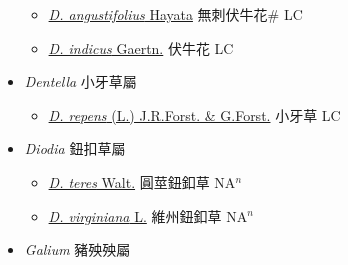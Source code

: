 \begin{itemize}
  \begin{itemize}
        \item[] \href{http://www.theplantlist.org/tpl1.1/search?q=Damnacanthus+angustifolius}{\textit{D. angustifolius} Hayata}   無刺伏牛花\# LC
        \item[] \href{http://www.theplantlist.org/tpl1.1/search?q=Damnacanthus+indicus}{\textit{D. indicus} Gaertn.}   伏牛花 LC
  \end{itemize}
 \item[] \textit{Dentella} 小牙草屬
                    
  \begin{itemize}
        \item[] \href{http://www.theplantlist.org/tpl1.1/search?q=Dentella+repens}{\textit{D. repens} (L.) J.R.Forst. \& G.Forst.}   小牙草 LC
  \end{itemize}
 \item[] \textit{Diodia} 鈕扣草屬
                    
  \begin{itemize}
        \item[] \href{http://www.theplantlist.org/tpl1.1/search?q=Diodia+teres}{\textit{D. teres} Walt.}   圓莖鈕釦草 NA$^n$
        \item[] \href{http://www.theplantlist.org/tpl1.1/search?q=Diodia+virginiana}{\textit{D. virginiana} L.}   維州鈕釦草 NA$^n$
  \end{itemize}
 \item[] \textit{Galium} 豬殃殃屬
                    

\end{itemize}
